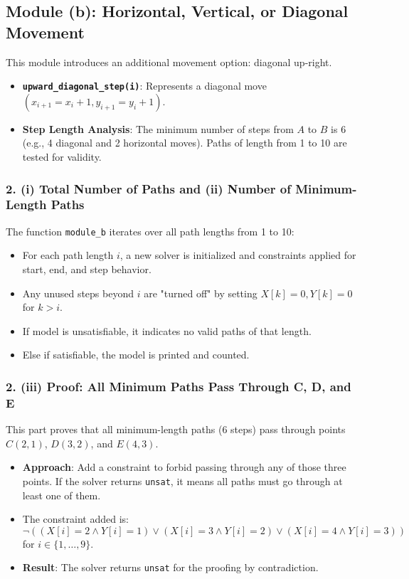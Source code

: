 \documentclass[11pt,a4paper
]{article}
\begin{document}
\subsection*{Module (b): Horizontal, Vertical, or Diagonal Movement}

This module introduces an additional movement option: diagonal up-right.

\begin{itemize}
  \item \textbf{\texttt{upward\_diagonal\_step(i)}}: Represents a diagonal move \( (x_{i+1} = x_i + 1, y_{i+1} = y_i + 1) \).
  \item \textbf{Step Length Analysis}: The minimum number of steps from \( A \) to \( B \) is 6 (e.g., 4 diagonal and 2 horizontal moves). Paths of length from 1 to 10 are tested for validity.
\end{itemize}

\subsubsection*{2. (i) Total Number of Paths and (ii) Number of Minimum-Length Paths}

The function \texttt{module\_b} iterates over all path lengths from 1 to 10:
\begin{itemize}
  \item For each path length \( i \), a new solver is initialized and constraints applied for start, end, and step behavior.
  \item Any unused steps beyond \( i \) are "turned off" by setting \( X[k] = 0, Y[k] = 0 \) for \( k > i \).
  \item If model is unsatisfiable, it indicates no valid paths of that length.
  \item Else if satisfiable, the model is printed and counted.
\end{itemize}

\subsubsection*{2. (iii) Proof: All Minimum Paths Pass Through C, D, and E}

This part proves that all minimum-length paths (6 steps) pass through points \( C(2,1) \), \( D(3,2) \), and \( E(4,3) \).
\begin{itemize}
  \item \textbf{Approach}: Add a constraint to forbid passing through any of those three points. If the solver returns \texttt{unsat}, it means all paths must go through at least one of them.
  \item The constraint added is:
        \[
          \neg \left( (X[i] = 2 \land Y[i] = 1) \lor (X[i] = 3 \land Y[i] = 2) \lor (X[i] = 4 \land Y[i] = 3) \right)
        \]
        for \( i \in \{1, \ldots, 9\} \).
  \item \textbf{Result}: The solver returns \texttt{unsat} for the proofing by contradiction.
\end{itemize}
\end{document}
